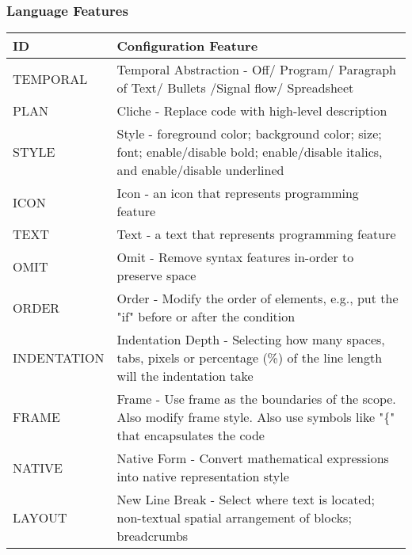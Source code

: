 \subsubsection{Language Features}
\begin{table}[H]
\centering
\begin{tabular}{|l|p{14cm}|}
\hline
\textbf{ID}           & \textbf{Configuration Feature}                                                                                                              \\ \hline
TEMPORAL     & Temporal Abstraction - Off/ Program/ Paragraph of Text/ Bullets /Signal flow/ Spreadsheet                                          \\ \hline
PLAN         & Cliche - Replace code with high-level description                                                                                  \\ \hline
STYLE        & Style - foreground color; background color; size; font; enable/disable bold; enable/disable italics, and enable/disable underlined \\ \hline
ICON         & Icon - an icon that represents programming feature                                                                                 \\ \hline
TEXT         & Text - a text that represents programming feature                                                                                  \\ \hline
OMIT         & Omit - Remove syntax features in-order to preserve space                                                                           \\ \hline
ORDER        & Order - Modify the order of elements, e.g., put the "if" before or after the condition                                             \\ \hline
INDENTATION  & Indentation Depth - Selecting how many spaces, tabs, pixels or percentage (\%) of the line length will the indentation take        \\ \hline
FRAME        & Frame - Use frame as the boundaries of the scope. Also modify frame style. Also use symbols like "\{" that encapsulates the code   \\ \hline
NATIVE       & Native Form - Convert mathematical expressions into native representation style                                                    \\ \hline
LAYOUT       & New Line Break - Select where text is located; non-textual spatial arrangement of blocks; breadcrumbs                              \\ \hline

\end{tabular}
\end{table}
